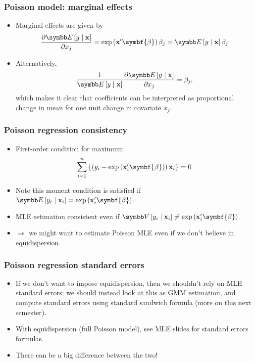 \documentclass[aspectratio=169,11pt]{beamer}
\begin{document}
\begin{frame}
\frametitle{Poisson model: marginal effects} 
\begin{itemize}
\item Marginal effects are given by\[
	\frac{\partial \E\left[y \mid {\bf x}\right]}{\partial x_j} = \exp\left( {\bf x}'\symbf{\beta}\right) \beta_j =
	\E\left[y \mid {\bf x}\right] \beta_j 
\]

	\item Alternatively,\[
	\frac{1}{\E\left[y \mid {\bf x}\right] }\frac{\partial \E\left[y \mid {\bf x}\right]}{\partial x_j}  = \beta_j,
\]
which makes it clear that coefficients can be interpreted as proportional change in mean for one unit change in covariate $x_j$. 


\end{itemize}
\end{frame}



\begin{frame}
\frametitle{Poisson regression consistency} 
\begin{itemize}
	\item First-order condition for maximum:\[
  \sum_{i=1}^{n}\left\{\left(y_i -\exp\left({\bf x}_{i}'\symbf{\beta} \right) \right) {\bf x}_{i} \right\} =0
	\]

	\smallskip
	\item Note this moment condition is satisfied if $\E\left[y_i \mid {\bf x}_i\right] = \exp\left({\bf x}_{i}'\symbf{\beta}\right)$.

	\smallskip
	\item MLE estimation consistent even if $\Var\left[y_i \mid {\bf x}_i\right] \ne \exp\left({\bf x}_{i}'\symbf{\beta}\right)$. 

	\smallskip
	\item $\Rightarrow$ we might want to estimate Poisson MLE even if we don't believe in equidispersion.
\end{itemize}
\end{frame}



\begin{frame}
\frametitle{Poisson regression standard errors} 
\begin{itemize}
	\item If we don't want to impose equidispersion, then we shouldn't rely on MLE standard errors;
	we should instead look at this as GMM estimation, and compute
	standard errors using standard sandwich formula (more on this next semester).

	\smallskip
	\item With equidispersion (full Poisson model), see MLE slides for standard errors formulas.

	\smallskip
	\item There can be a big difference between the two!
\end{itemize}
\end{frame}
\end{document}
